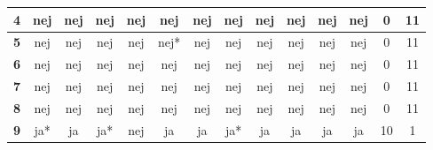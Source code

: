 \begin{table}[H]
\begin{tabular}{l|c|c|c|c|c|c|c|c|c|c|c|c|c}
\cellcolor[HTML]{C0C0C0}\textbf{4}	 & \cellcolor[HTML]{ECF4FF} nej	& \cellcolor[HTML]{ECF4FF}nej &	\cellcolor[HTML]{ECF4FF}nej &\cellcolor[HTML]{ECF4FF} nej	& \cellcolor[HTML]{ECF4FF}nej &	\cellcolor[HTML]{ECF4FF}nej	& \cellcolor[HTML]{ECF4FF}nej & \cellcolor[HTML]{ECF4FF}nej	& \cellcolor[HTML]{ECF4FF}nej	& \cellcolor[HTML]{ECF4FF}nej	& \cellcolor[HTML]{ECF4FF}nej & \cellcolor[HTML]{EFEFEF}0 & \cellcolor[HTML]{EFEFEF}11\\ \hline 
\cellcolor[HTML]{C0C0C0}\textbf{5}	 & \cellcolor[HTML]{ECF4FF} nej	& \cellcolor[HTML]{ECF4FF}nej &	\cellcolor[HTML]{ECF4FF}nej &\cellcolor[HTML]{ECF4FF} nej	& \cellcolor[HTML]{ECF4FF}nej* &	\cellcolor[HTML]{ECF4FF}nej	& \cellcolor[HTML]{ECF4FF}nej & \cellcolor[HTML]{ECF4FF}nej	& \cellcolor[HTML]{ECF4FF}nej	& \cellcolor[HTML]{ECF4FF}nej	& \cellcolor[HTML]{ECF4FF}nej & \cellcolor[HTML]{EFEFEF}0 & \cellcolor[HTML]{EFEFEF}11\\ \hline 
\cellcolor[HTML]{C0C0C0}\textbf{6}	 & \cellcolor[HTML]{ECF4FF} nej	& \cellcolor[HTML]{ECF4FF}nej &	\cellcolor[HTML]{ECF4FF}nej &\cellcolor[HTML]{ECF4FF} nej	& \cellcolor[HTML]{ECF4FF}nej &	\cellcolor[HTML]{ECF4FF}nej	& \cellcolor[HTML]{ECF4FF}nej & \cellcolor[HTML]{ECF4FF}nej	& \cellcolor[HTML]{ECF4FF}nej	& \cellcolor[HTML]{ECF4FF}nej	& \cellcolor[HTML]{ECF4FF}nej & \cellcolor[HTML]{EFEFEF}0 & \cellcolor[HTML]{EFEFEF}11\\ \hline 
\cellcolor[HTML]{C0C0C0}\textbf{7}	 & \cellcolor[HTML]{ECF4FF} nej	& \cellcolor[HTML]{ECF4FF}nej &	\cellcolor[HTML]{ECF4FF}nej &\cellcolor[HTML]{ECF4FF} nej	& \cellcolor[HTML]{ECF4FF}nej &	\cellcolor[HTML]{ECF4FF}nej	& \cellcolor[HTML]{ECF4FF}nej & \cellcolor[HTML]{ECF4FF}nej	& \cellcolor[HTML]{ECF4FF}nej	& \cellcolor[HTML]{ECF4FF}nej	& \cellcolor[HTML]{ECF4FF}nej & \cellcolor[HTML]{EFEFEF}0 & \cellcolor[HTML]{EFEFEF}11\\ \hline 
\cellcolor[HTML]{C0C0C0}\textbf{8}	 & \cellcolor[HTML]{ECF4FF} nej	& \cellcolor[HTML]{ECF4FF}nej &	\cellcolor[HTML]{ECF4FF}nej &\cellcolor[HTML]{ECF4FF} nej	& \cellcolor[HTML]{ECF4FF}nej &	\cellcolor[HTML]{ECF4FF}nej	& \cellcolor[HTML]{ECF4FF}nej & \cellcolor[HTML]{ECF4FF}nej	& \cellcolor[HTML]{ECF4FF}nej	& \cellcolor[HTML]{ECF4FF}nej	& \cellcolor[HTML]{ECF4FF}nej & \cellcolor[HTML]{EFEFEF}0 & \cellcolor[HTML]{EFEFEF}11\\ \hline 
\cellcolor[HTML]{C0C0C0}\textbf{9}	& ja* 	& ja  &	ja*  & \cellcolor[HTML]{FFFC9E}nej   & ja  & ja  &ja*   &ja &ja &ja &ja & \cellcolor[HTML]{EFEFEF}10 & \cellcolor[HTML]{EFEFEF}1 \\ \hline

\end{tabular}
\end{table}
